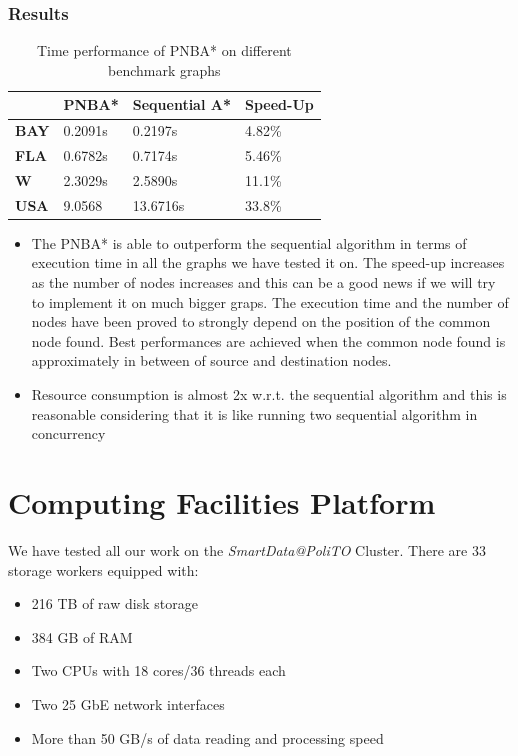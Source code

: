 \documentclass[twocolumn, switch]{article} %
\begin{document}
\subsubsection{Results}
\begin{table}[ht!]
  \begin{tabular}{|l|l|l|l|}
  \caption{Time performance of PNBA* on different benchmark graphs}
  \hline
  \textbf{}    & \textbf{PNBA*} & \textbf{Sequential A*} & \textbf{Speed-Up} \\ \hline
  \textbf{BAY} & 0.2091s        & 0.2197s                & 4.82\%            \\ \hline
  \textbf{FLA} & 0.6782s        & 0.7174s                & 5.46\%            \\ \hline
  \textbf{W}   & 2.3029s        & 2.5890s                & 11.1\%            \\ \hline
  \textbf{USA} & 9.0568         & 13.6716s               & 33.8\%            \\ \hline
  \end{tabular}
  \label{pnbatable}
\end{table}
\begin{itemize}
  \item The PNBA* is able to outperform the sequential algorithm in terms of execution time in all the 
        graphs we have tested it on. The speed-up increases as the number of nodes increases and this can 
        be a good news if we will try to implement it on much bigger graps. The execution time and the number of
        nodes have been proved to strongly depend on the position of the common node found. Best performances
        are achieved when the common node found is approximately in between of source and destination nodes.
  \item Resource consumption is almost 2x w.r.t. the sequential algorithm and this is reasonable considering
        that it is like running two sequential algorithm in concurrency
\end{itemize}

\section{Computing Facilities Platform}
We have tested all our work on the \textit{SmartData@PoliTO} Cluster.
There are $33$ storage workers equipped with:
\begin{itemize}
  \item 216 TB of raw disk storage
  \item 384 GB of RAM
  \item Two CPUs with 18 cores/36 threads each
  \item Two 25 GbE network interfaces
  \item More than 50 GB/s of data reading and processing speed
\end{itemize}
\end{document}
